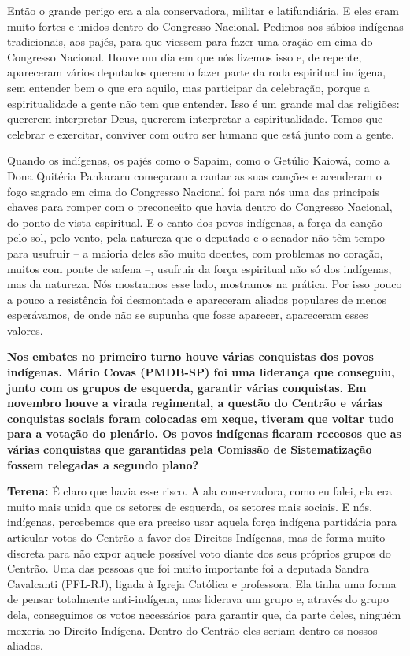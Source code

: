 Então o grande perigo era a ala conservadora, militar e latifundiária. E
eles eram muito fortes e unidos dentro do Congresso Nacional. Pedimos
aos sábios indígenas tradicionais, aos pajés, para que viessem para
fazer uma oração em cima do Congresso Nacional. Houve um dia em que nós
fizemos isso e, de repente, apareceram vários deputados querendo fazer
parte da roda espiritual indígena, sem entender bem o que era aquilo,
mas participar da celebração, porque a espiritualidade a gente não tem
que entender. Isso é um grande mal das religiões: quererem interpretar
Deus, quererem interpretar a espiritualidade. Temos que celebrar e
exercitar, conviver com outro ser humano que está junto com a gente.

Quando os indígenas, os pajés como o Sapaim, como o Getúlio Kaiowá, como
a Dona Quitéria Pankararu começaram a cantar as suas canções e acenderam
o fogo sagrado em cima do Congresso Nacional foi para nós uma das
principais chaves para romper com o preconceito que havia dentro do
Congresso Nacional, do ponto de vista espiritual. E o canto dos povos
indígenas, a força da canção pelo sol, pelo vento, pela natureza que o
deputado e o senador não têm tempo para usufruir -- a maioria deles são
muito doentes, com problemas no coração, muitos com ponte de safena --,
usufruir da força espiritual não só dos indígenas, mas da natureza. Nós
mostramos esse lado, mostramos na prática. Por isso pouco a pouco a
resistência foi desmontada e apareceram aliados populares de menos
esperávamos, de onde não se supunha que fosse aparecer, apareceram esses
valores.

\textbf{Nos embates no primeiro turno houve várias conquistas dos povos
indígenas. Mário Covas (PMDB-SP) foi uma liderança que conseguiu, junto
com os grupos de esquerda, garantir várias conquistas. Em novembro houve
a virada regimental, a questão do Centrão e várias conquistas sociais
foram colocadas em xeque, tiveram que voltar tudo para a votação do
plenário. Os povos indígenas ficaram receosos que as várias conquistas
que garantidas pela Comissão de Sistematização fossem relegadas a
segundo plano?}

\textbf{Terena:} É claro que havia esse risco. A ala conservadora, como
eu falei, ela era muito mais unida que os setores de esquerda, os
setores mais sociais. E nós, indígenas, percebemos que era preciso usar
aquela força indígena partidária para articular votos do Centrão a favor
dos Direitos Indígenas, mas de forma muito discreta para não expor
aquele possível voto diante dos seus próprios grupos do Centrão. Uma das
pessoas que foi muito importante foi a deputada Sandra Cavalcanti
(PFL-RJ), ligada à Igreja Católica e professora. Ela tinha uma forma de
pensar totalmente anti-indígena, mas liderava um grupo e, através do
grupo dela, conseguimos os votos necessários para garantir que, da parte
deles, ninguém mexeria no Direito Indígena. Dentro do Centrão eles
seriam dentro os nossos aliados.

